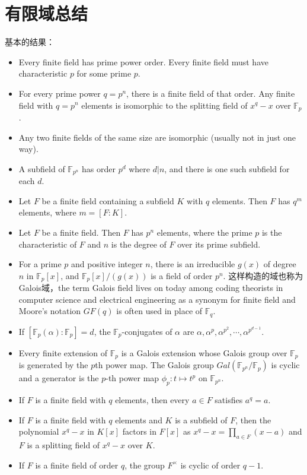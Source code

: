\chapter{有限域总结}

基本的结果：
\begin{itemize}
	\item  Every finite field has prime power order. Every finite field must have characteristic $p$ for some prime $p$.
	\item For every prime power $q = p^n$, there is a finite field of that order. Any finite field with $q = p^n$ elements is isomorphic to the splitting field of $x^q - x$ over $\mathbb{F}_p$.
	\item Any two finite fields of the same size are isomorphic (usually not in just one way).
	\item A subfield of $\mathbb{F}_{p^n}$ has order $p^d$ where $d|n$, and there is one such subfield for each $d$.
	\item Let $F$ be a finite field containing a subfield $K$ with $q$ elements. Then $F$ has $q^m$ elements, where $m = [F : K]$.
	\item Let $F$ be a finite field. Then $F$ has $p^n$ elements, where the prime $p$ is the characteristic of $F$ and $n$ is the degree of $F$ over its prime subfield.
	\item For a prime $p$ and positive integer $n$, there is an irreducible $g(x)$ of degree $n$ in $\mathbb{F}_p[x]$, and $\mathbb{F}_p[x]/(g(x))$ is a field of order $p^n$. 这样构造的域也称为Galois域，the term Galois field lives on today among coding theorists in computer science and electrical engineering as a synonym for finite field and Moore’s notation $GF(q)$ is often used in place of $\mathbb{F}_q$.
	\item If $[\mathbb{F}_p(\alpha) : \mathbb{F}_p] = d$, the $\mathbb{F}_p$-conjugates of $\alpha$ are $\alpha,\alpha^p,\alpha^{p^2},\cdots,\alpha^{p^{d-1}}$.
	\item Every finite extension of $\mathbb{F}_p$ is a Galois extension whose Galois group over $\mathbb{F}_p$ is generated by the $p$th power map. The Galois group $Gal(\mathbb{F}_{p^n}/\mathbb{F}_p)$ is cyclic and a generator is the $p$-th power map $\phi_p\colon t \mapsto t^p$ on $\mathbb{F}_{p^n}$.
	\item If $F$ is a finite field with $q$ elements, then every $a \in F$ satisfies $a^q = a$.
	\item If $F$ is a finite field with $q$ elements and $K$ is a subfield of $F$, then the polynomial $x^q - x$ in $K[x]$ factors in $F[x]$ as $x^q -x= \prod_{a\in F}(x-a)$ and $F$ is a splitting field of $x^q -x$ over $K$.

	\item If $F$ is a finite field of order $q$, the group $F^\times$ is cyclic of order $q-1$.
\end{itemize}


